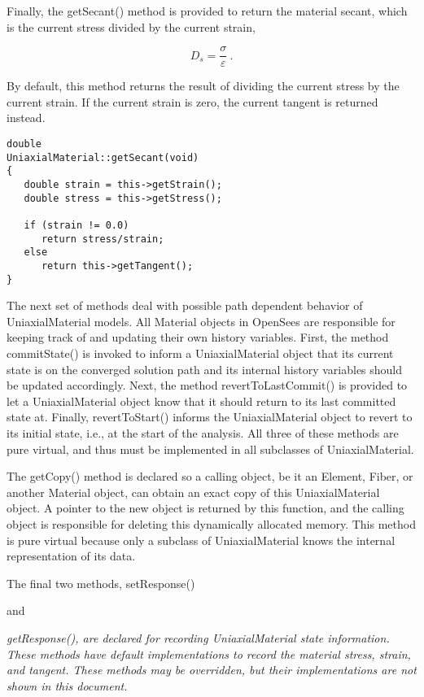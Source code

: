 \documentclass[12pt]{article}
\begin{document}
{Finally, the getSecant() method is provided to return the material secant, which
is the current stress divided by the current strain,

\begin{equation}
 D_s = \frac{\sigma}{\varepsilon} \: .
\end{equation}

\noindent By default, this method returns the result of dividing the current stress
by the current strain.  If the current strain is zero, the current tangent is returned
instead.

{\sf\small
\begin{verbatim}
double
UniaxialMaterial::getSecant(void)
{
   double strain = this->getStrain();
   double stress = this->getStress();

   if (strain != 0.0)
      return stress/strain;
   else
      return this->getTangent();
}
\end{verbatim}
}

The next set of methods deal with possible path dependent behavior of UniaxialMaterial models.
All Material objects in OpenSees are responsible for keeping track of and updating their
own history variables. First, the method commitState() is invoked to inform a
UniaxialMaterial object that its current state is on the converged solution path and
its internal history variables should be updated accordingly. Next, the method
revertToLastCommit() is provided to let a UniaxialMaterial object know that it
should return to its last committed state at. Finally, revertToStart() informs the
UniaxialMaterial object to revert to its initial state, i.e., at the start of
the analysis. All three of these methods are pure virtual, and thus must be implemented
in all subclasses of UniaxialMaterial.

The getCopy() method is declared so a calling object, be it an Element, Fiber, or
another Material object, can obtain an exact copy of this UniaxialMaterial object. A pointer
to the new object is returned by this function, and the calling object is responsible for
deleting this dynamically allocated memory. This method is pure virtual because only
a subclass of UniaxialMaterial knows the internal representation of its data.

The final two methods, setResponse()} and {\em getResponse(), are declared for
recording UniaxialMaterial state information. These methods have default implementations
to record the material stress, strain, and tangent. These methods may be overridden, but
their implementations are not shown in this document.

}
\end{document}
